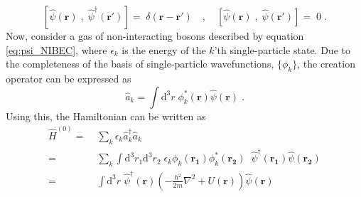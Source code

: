 \begin{equation}
	\left[ \hat{\psi}(\boldsymbol{r}) \; , \; \hat{\psi}^{\dag}(\boldsymbol{r'}) \right] = \; \delta(\boldsymbol{r} - \boldsymbol{r}') \quad , \quad
	\left[ \hat{\psi}(\boldsymbol{r}) \; , \; \hat{\psi}(\boldsymbol{r'}) \right] = \; 0 \; .
\end{equation}
Now, consider a gas of non-interacting bosons described by equation \eqref{eq:psi_NIBEC}, where $\epsilon_k$ is the energy of the $k$'th single-particle state. Due to the completeness of the basis of single-particle wavefunctions, $\{ \phi_k \}$, the creation operator can be expressed as
\begin{equation}
	\hat{a}_k = \int \mathrm{d^3} r \;  \phi_{k}^*(\boldsymbol{r}) \hat{\psi}(\boldsymbol{r}) \; .
\end{equation}
Using this, the Hamiltonian can be written as
\begin{align}
	\hat{H}^{(0)} =& \; \sum_{k} \epsilon_k \hat{a}_{k}^{\dag} \hat{a}_{k} \nonumber \\
		=& \;  \sum_{k} \int \mathrm{d^3}r_1 \mathrm{d^3}r_2 \; \epsilon_k \phi_k (\boldsymbol{r_1}) \phi_{k}^* (\boldsymbol{r_2})\; \; \hat{\psi}^{\dag} (\boldsymbol{r_1}) \hat{\psi} (\boldsymbol{r_2}) \nonumber \\
		=& \; \int \mathrm{d^3}r  \; \hat{\psi}^{\dag}(\boldsymbol{r}) \left( - \frac{\hbar^2}{2 m} \nabla^2 + U(\boldsymbol{r})\right) \hat{\psi}(\boldsymbol{r})
		\label{hamil2nd}
\end{align}

